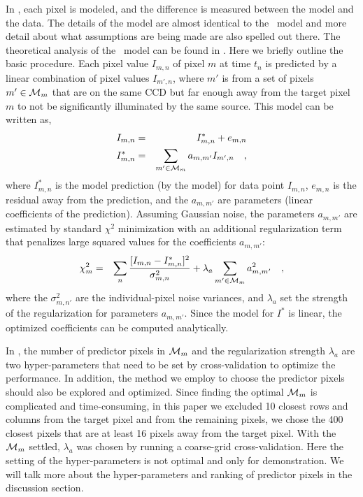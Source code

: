 In \cpmdiff, each pixel is modeled, and the difference is measured between the model and the data. 
The details of the model are almost identical to the \cpm\ model \citep{cpm} and more detail about what assumptions are being made are also spelled out there. 
The theoretical analysis of the \cpm\ model can be found in \cite{pnas}.
Here we briefly outline the basic procedure. 
Each pixel value $I_{m,n}$ of pixel $m$ at time $t_n$ is predicted by a linear combination of pixel values $I_{m',n}$, where $m'$ is from a set of pixels $m'\in\mathcal{M}_m$ that are on the same CCD but far enough away from the target pixel $m$ to not be significantly illuminated by the same source. 
This model can be written as,
\begin{eqnarray}
I_{m,n}         &=& I^{\ast}_{m,n} + e_{m,n}
\\
I^{\ast}_{m,n}  &=& \sum_{m'\in\mathcal{M}_m} a_{m,m'}I_{m',n} 
\quad,
\end{eqnarray}
where $I^{\ast}_{m,n}$ is the model prediction (by the model) for data point $I_{m,n}$, $e_{m,n}$ is the residual away from the prediction, and the $a_{m,m'}$ are parameters (linear coefficients of the prediction).
Assuming Gaussian noise, the parameters $a_{m,m'}$ are estimated by standard $\chi^2$ minimization with an additional regularization term that penalizes large squared values for the coefficients $a_{m,m'}$:
\begin{eqnarray}
\chi^2_{m}    &=& \sum_{n} \frac{[I_{m,n} - I^{\ast}_{m,n}]^2}{\sigma^2_{m,n}}+ \lambda_{a}\sum_{m'\in\mathcal{M}_m}a_{m,m'}^2 
\quad,
\end{eqnarray}
where the $\sigma^2_{m,n'}$ are the individual-pixel noise variances, and $\lambda_{a}$ set the strength of the regularization for parameters $a_{m,m'}$.
Since the model for $I^{\ast}$ is linear, the optimized coefficients can be computed analytically.

In \cpm, the number of predictor pixels in $\mathcal{M}_m$ and the regularization strength $\lambda_{a}$ are two hyper-parameters that need to be set by cross-validation to optimize the performance. 
In addition, the method we employ to choose the predictor pixels should also be explored and optimized.
Since finding the optimal $\mathcal{M}_m$ is complicated and time-consuming, in this paper we excluded 10 closest rows and columns from the target pixel and from the remaining pixels, we chose the 400 closest pixels that are at least 16 pixels away from the target pixel.
With the $\mathcal{M}_m$ settled, $\lambda_{a}$ was chosen by running a coarse-grid cross-validation. 
Here the setting of the hyper-parameters is not optimal and only for demonstration. 
We will talk more about the hyper-parameters and ranking of predictor pixels in the discussion section.

